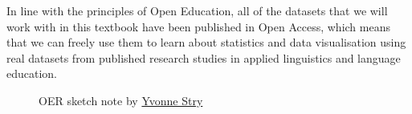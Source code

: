 \documentclass[
  letterpaper,
  DIV=11,
  numbers=noendperiod,
  oneside]{scrreprt}
\begin{document}
In line with the principles of Open Education, all of the datasets that
we will work with in this textbook have been published in Open Access,
which means that we can freely use them to learn about statistics and
data visualisation using real datasets from published research studies
in applied linguistics and language education.

\begin{figure}


\caption{\label{fig-OER}OER sketch note by
\href{https://leko.th-nuernberg.de/portal_digitale_lehre/praxisbeispiele/lehrmaterialien-teilen-fuer-flexibles-lernen/}{Yvonne
Stry}}

\end{figure}%
\end{document}
